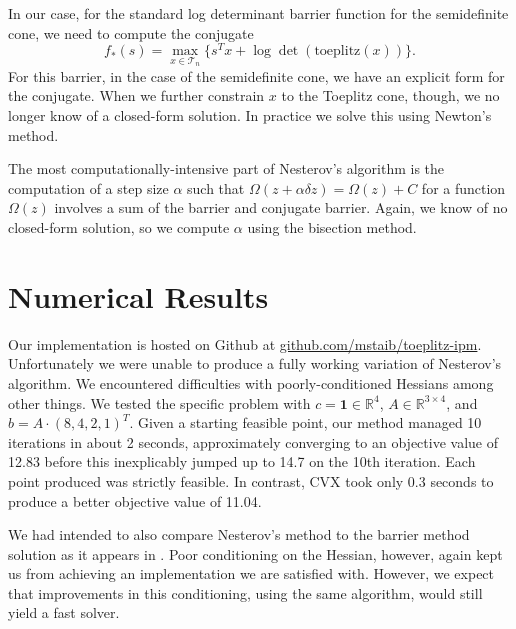 \documentclass{article}
\begin{document}
In our case, for the standard log determinant barrier function for the semidefinite cone, we need to compute the conjugate
\begin{equation}
f_*(s) = \max_{x \in \mathcal T_n} \{ s^T x + \log\det(\text{toeplitz}(x))\}.
\end{equation}
For this barrier, in the case of the semidefinite cone, we have an explicit
form for the conjugate. When we further constrain $x$ to the Toeplitz cone,
though, we no longer know of a closed-form solution. In practice we solve this
using Newton's method.

The most computationally-intensive part of Nesterov's algorithm is the
computation of a step size $\alpha$ such that $\Omega(z + \alpha \delta z) =
\Omega(z) + C$ for a function $\Omega(z)$ involves a sum of the barrier and
conjugate barrier. Again, we know of no closed-form solution, so we compute
$\alpha$ using the bisection method.

\section{Numerical Results}
Our implementation is hosted on Github at \url{github.com/mstaib/toeplitz-ipm}.
Unfortunately we were unable to produce a fully working variation of Nesterov's
algorithm. We encountered difficulties with poorly-conditioned Hessians among
other things. We tested the specific problem with $c = \mathbf 1 \in \mathbb
R^4$, $A \in \mathbb R^{3\times 4}$, and $b = A \cdot (8,4,2,1)^T$. Given a
starting feasible point, our method managed 10 iterations in about 2 seconds,
approximately converging to an objective value of 12.83 before this
inexplicably jumped up to 14.7 on the 10th iteration. Each point produced was
strictly feasible. In contrast, CVX took only 0.3 seconds to produce a better
objective value of 11.04.

We had intended to also compare Nesterov's method to the barrier method
solution as it appears in \cite{alkire2002convex}. Poor conditioning on the
Hessian, however, again kept us from achieving an implementation we are
satisfied with. However, we expect that improvements in this conditioning,
using the same algorithm, would still yield a fast solver.


\end{document}
